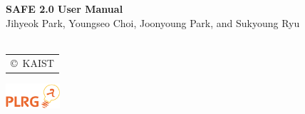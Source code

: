 \documentclass[oneside,openany,a4paper,10pt]{book}
\begin{document}
\begin{titlepage}
    \vspace*{15em}
    \centering
    {\bfseries\Huge
        SAFE 2.0 User Manual\\
    }    
        \vskip2cm
       {\Large
 Jihyeok Park, Youngseo Choi, Joonyoung Park, and Sukyoung Ryu}\\
~\\
\large
\begin{tabular}{c}
                        \copyright\ KAIST
\end{tabular}
\includegraphics[width=2cm]{plrg-logo.png}
\end{titlepage}

\multibegin
\raggedcolumns









\normalsize



\multiend
\end{document}
